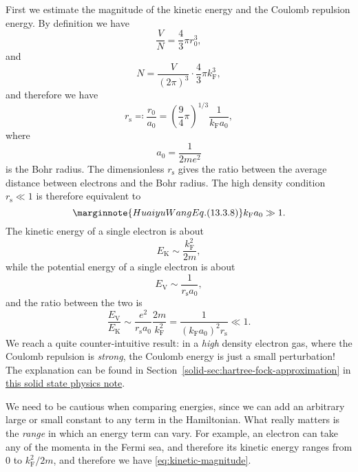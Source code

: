 \documentclass[hyperref, a4paper]{article}
\newcommand{\soliddoc}{\href{../solid/solid.pdf}{this solid state physics note}}
\begin{document}
First we estimate the magnitude of the kinetic energy and the Coulomb repulsion energy. By definition we have 
\[
    \frac{V}{N} = \frac{4}{3} \pi r_0^3, 
\]
and 
\[
    N = \frac{V}{(2\pi)^3} \cdot \frac{4}{3} \pi k_\text{F}^3,
\]
and therefore we have 
\begin{equation}
    r_\text{s} \eqqcolon \frac{r_0}{a_0} = \left(\frac{9}{4} \pi\right)^{1/3} \frac{1}{k_\text{F} a_0},
\end{equation}
where
\begin{equation}
    a_0 = \frac{1}{2 m e^2}
\end{equation}
is the Bohr radius. The dimensionless $r_\text{s}$ gives the ratio between the average distance 
between electrons and the Bohr radius. The high density condition $r_\text{s} \ll 1$ is therefore equivalent to 
\begin{equation} \marginnote{Huaiyu Wang Eq. (13.3.8)}
    k_\text{F} a_0 \gg 1.
\end{equation}
The kinetic energy of a single electron is about 
\begin{equation}
    E_\text{K} \sim \frac{k_\text{F}^2}{2m},
    \label{eq:kinetic-magnitude}
\end{equation}
while the potential energy of a single electron is about 
\begin{equation}
    E_\text{V} \sim \frac{1}{r_\text{s} a_0},
    \label{eq:potential-magnitude}
\end{equation}
and the ratio between the two is 
\begin{equation}
    \frac{E_\text{V}}{E_\text{K}} \sim \frac{e^2}{r_\text{s} a_0} \frac{2m}{k_\text{F}^2} = \frac{1}{(k_\text{F} a_0)^2 r_\text{s}} \ll 1.
\end{equation}
We reach a quite counter-intuitive result: in a \emph{high} density electron gas, where the Coulomb repulsion 
is \emph{strong}, the Coulomb energy is just a small perturbation! The explanation can be found in 
Section~\ref{solid-sec:hartree-fock-approximation} in \soliddoc. 

\begin{note*}{}
    We need to be cautious when comparing energies, since we can add an arbitrary large or small constant to 
    any term in the Hamiltonian. What really matters is the \emph{range} in which an energy term can vary.
    For example, an electron can take any of the momenta in the Fermi sea, and therefore its kinetic 
    energy ranges from $0$ to $k_\text{F}^2 / 2m$, and therefore we have \eqref{eq:kinetic-magnitude}.
\end{note*}
\end{document}
